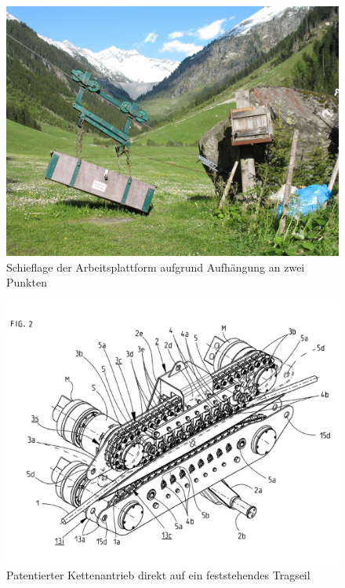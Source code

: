 \documentclass[a4paper,11pt]{scrartcl}
\begin{document}
\begin{figure}
    \includegraphics[width=\textwidth]{abbildung3.jpg}
    \caption{Schieflage der Arbeitsplattform aufgrund Aufhängung an zwei Punkten\protect\footnotemark}
    \label{fig:abb3}
\end{figure}

\begin{figure}
    \includegraphics[width=\textwidth]{abbildung4.jpg}
    \caption{Patentierter Kettenantrieb direkt auf ein feststehendes Tragseil\protect\footnotemark}
    \label{fig:abb4}
\end{figure}
\end{document}

